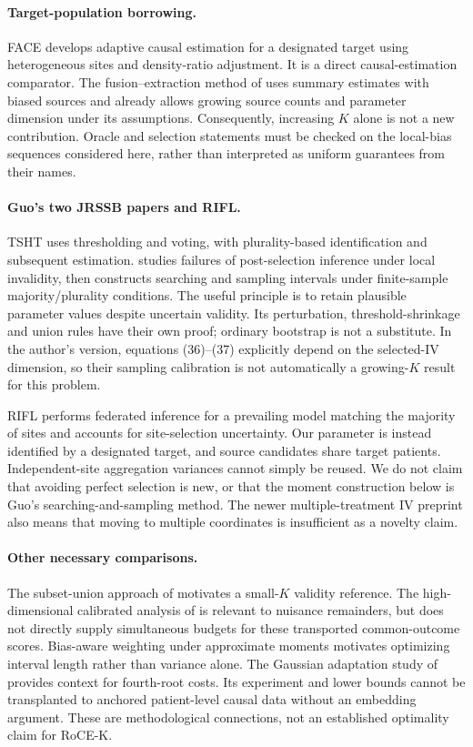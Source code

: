 \paragraph{Target-population borrowing.}
FACE \citep{face2025} develops adaptive causal estimation for a designated
target using heterogeneous sites and density-ratio adjustment. It is a
direct causal-estimation comparator. The fusion--extraction method of
\citet{fusion2023} uses summary estimates with biased sources and already
allows growing source counts and parameter dimension under its assumptions.
Consequently, increasing $K$ alone is not a new contribution. Oracle and
selection statements must be checked on the local-bias sequences considered
here, rather than interpreted as uniform guarantees from their names.

\paragraph{Guo's two JRSSB papers and RIFL.}
TSHT \citep{guo2018} uses thresholding and voting, with plurality-based
identification and subsequent estimation. \citet{guo2023} studies failures
of post-selection inference under local invalidity, then constructs searching
and sampling intervals under finite-sample majority/plurality conditions.
The useful principle is to retain plausible parameter values despite
uncertain validity. Its perturbation, threshold-shrinkage and union rules
have their own proof; ordinary bootstrap is not a substitute.
In the author's version, equations (36)--(37) explicitly depend on the
selected-IV dimension, so their sampling calibration is not automatically
a growing-$K$ result for this problem.

RIFL \citep{rifl2025} performs federated inference for a prevailing model
matching the majority of sites and accounts for site-selection uncertainty.
Our parameter is instead identified by a designated target, and source
candidates share target patients. Independent-site aggregation variances
cannot simply be reused. We do not claim that avoiding perfect selection is
new, or that the moment construction below is Guo's searching-and-sampling
method. The newer multiple-treatment IV preprint \citep{mei2026} also means
that moving to multiple coordinates is insufficient as a novelty claim.

\paragraph{Other necessary comparisons.}
The subset-union approach of \citet{kang2022} motivates a small-$K$ validity
reference. The high-dimensional calibrated analysis of \citet{tan2020}
is relevant to nuisance remainders, but does not directly supply simultaneous
budgets for these transported common-outcome scores. Bias-aware weighting
under approximate moments \citep{armstrong2021} motivates optimizing interval
length rather than variance alone. The Gaussian adaptation study of
\citet{wang2026} provides context for fourth-root costs. Its experiment and
lower bounds cannot be transplanted to anchored patient-level causal data
without an embedding argument. These are methodological connections, not
an established optimality claim for RoCE-K.

